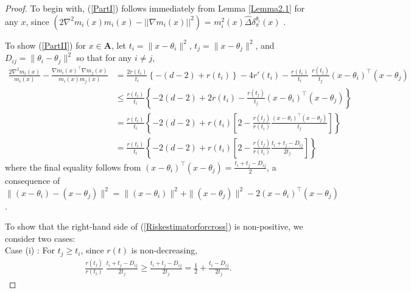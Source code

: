 \documentclass[10pt,a4paper]{amsart}
\begin{document}
\begin{proof}
To begin with, (\ref{PartI}) follows immediately from Lemma \ref{Lemma2.1} for any $x$, since   $(2\nabla^2 m_i(x) m_i(x) - ||\nabla m_i(x)||^2)$ = $m_i^2(x) \hat{\Delta}\delta_\pi^{\theta_i}(x)$ .

To show (\ref{PartII}) for $x \in \textbf{A}$, let $t_i  = \|x - \theta_i\|^2$,  $t_j  = \|x - \theta_j\|^2$, and  $D_{ij}  = \|\theta_i - \theta_j\|^2$ so that   for any $i \neq j$,
   \begin{align}
   \nonumber  \frac{2\nabla^2 m_i(x)}{m_i(x)} - \frac{\nabla m_i(x)^{\top}\nabla m_j(x)}{m_i(x) m_j(x)} & =  \frac{2r(t_i)}{t_i}\left\{-(d-2) + r(t_i)\right\} - 4r'(t_i) - \frac{r(t_i)}{t_i}\;\frac{r(t_j)}{t_j}(x - \theta_i)^{\top}(x - \theta_j) \\
   \nonumber & \leq \frac{r(t_i)}{t_i} \left\{-2(d-2) + 2r(t_i) - \frac{r(t_j)}{t_j}(x - \theta_i)^{\top}(x - \theta_j)\right\} \\
    \nonumber & = \frac{r(t_i)}{t_i} \left\{-2(d-2) + r(t_i)\left[ 2  - \frac{r(t_j)}{r(t_i)} \frac{(x - \theta_i)^{\top}(x - \theta_j)}{t_j}\right]\right\} \\
    & = \frac{r(t_i)}{t_i} \left\{-2(d-2) + r(t_i)\left[ 2  - \frac{r(t_j)}{r(t_i)} \frac{t_i + t_j - D_{ij}}{2t_j}\right]\right\}
    \label{Riskestimatorforcross}
\end{align}
where the final equality follows from $(x - \theta_i)^{\top}(x - \theta_j) = \frac{t_i + t_j - D_{ij}}{2}$, a consequence of
$\|(x - \theta_i) - (x - \theta_j)\|^2 = \|(x - \theta_i)\|^2 + \| (x - \theta_j)\|^2 - 2(x - \theta_i)^{\top}(x - \theta_j)$.

To show that the right-hand side of (\ref{Riskestimatorforcross}) is non-positive, we consider two cases:\\
  
  {Case (i) \hspace{-1mm}:} For $t_j \geq t_i$, since $r(t)$ is non-decreasing,
  \begin{align}
    \nonumber   \frac{r(t_j)}{r(t_i)}\; \frac{t_i + t_j - D_{ij}}{2t_j} \geq \frac{t_i + t_j - D_{ij}}{2t_j} = \frac{1}{2} + \frac{t_i  - D_{ij}}{2t_j}.
  \end{align}
  

\end{proof}
\end{document}
